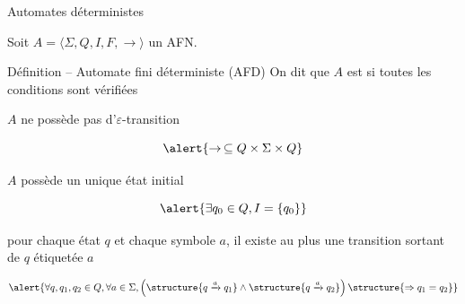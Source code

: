 
\begingroup

\begin{frame}{Automates déterministes}

  Soit $A = \langle \Sigma, Q, I, F, \rightarrow \rangle$ un AFN.
  
  \begin{block}{Définition -- Automate fini déterministe (AFD)}
    On dit que $A$ est  si toutes les conditions sont vérifiées
    \begin{description}
    \item[$\varepsilon$-libre :] $A$ ne possède pas d'$\varepsilon$-transition

      $$\alert{\rightarrow\, \subseteq Q \times \Sigma \times Q}$$

    \item[unitaire :] $A$ possède un unique état initial

      $$\alert{\exists q_0\in Q, I = \{q_0\}}$$

    \item[fonction partielle :] pour chaque état $q$ et chaque symbole $a$, il existe au plus une transition sortant de $q$ étiquetée $a$

      $$\alert{\forall q, q_1, q_2\in Q,  \forall a\in \Sigma, \left(\structure{q\xrightarrow{a} q_1} \land \structure{q\xrightarrow{a} q_2}\right) \structure{\Rightarrow q_1 = q_2}}$$
    \end{description}
  \end{block}

\end{frame}

\endgroup
\endinput
